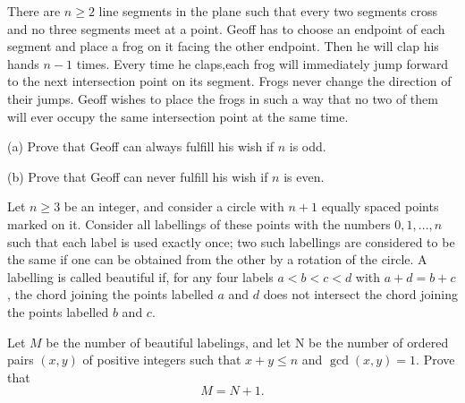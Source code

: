 \begin{problem}
[IMO2016PL6]
There are $n\ge 2$ line segments in the plane such that every two segments cross and no three segments meet at a point. Geoff has to choose an endpoint of each segment and place a frog on it facing the other endpoint. Then he will clap his hands $n-1$ times. Every time he claps,each frog will immediately jump forward to the next intersection point on its segment. Frogs never change the direction of their jumps. Geoff wishes to place the frogs in such a way that no two of them will ever occupy the same intersection point at the same time.

(a) Prove that Geoff can always fulfill his wish if $n$ is odd.

(b) Prove that Geoff can never fulfill his wish if $n$ is even.
\end{problem}

\begin{problem}
[IMO2013PL6]
Let $n \ge 3$ be an integer, and consider a circle with $n + 1$ equally spaced points marked on it. Consider all labellings of these points with the numbers $0, 1, ... , n$ such that each label is used exactly once; two such labellings are considered to be the same if one can be obtained from the other by a rotation of the circle. A labelling is called beautiful if, for any four labels $a < b < c < d$ with $a + d = b + c$, the chord joining the points labelled $a$ and $d$ does not intersect the chord joining the points labelled $b$ and $c$.

Let $M$ be the number of beautiful labelings, and let N be the number of ordered pairs $(x, y)$ of positive integers such that $x + y \le n$ and $\gcd(x, y) = 1$. Prove that\[M = N + 1.\]
\end{problem}
%

